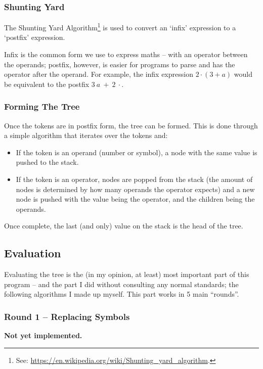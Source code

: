             \subsubsection*{Shunting Yard}
                The Shunting Yard Algorithm\footnote{See: \url{https://en.wikipedia.org/wiki/Shunting_yard_algorithm}.} is used to convert an `infix' expression to a `postfix' expression. 

                Infix is the common form we use to express maths -- with an operator between the operands; postfix, however, is easier for programs to parse and has the operator after the operand. For example, the infix expression $2 \cdot ( 3 + a )$ would be equivalent to the postfix $3~a~+~2~\cdot$.
            
            \subsubsection*{Forming The Tree}
                Once the tokens are in postfix form, the tree can be formed. This is done through a simple algorithm that iterates over the tokens and:
                \begin{itemize}
                    \item If the token is an operand (number or symbol), a node with the same value is pushed to the stack.
                    \item If the token is an operator, nodes are popped from the stack (the amount of nodes is determined by how many operands the operator expects) and a new node is pushed with the value being the operator, and the children being the operands.
                \end{itemize}

                \noindent Once complete, the last (and only) value on the stack is the head of the tree.
        
        \subsection{Evaluation}
            Evaluating the tree is the (in my opinion, at least) most important part of this program -- and the part I did without consulting any normal standards; the following algorithms I made up myself. This part works in 5 main ``rounds''.

            \subsubsection{Round 1 -- Replacing Symbols}
                \textbf{Not yet implemented.}

